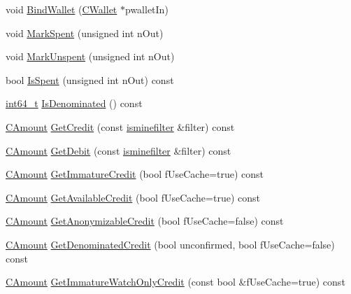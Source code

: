 \begin{DoxyCompactItemize}
void \hyperlink{class_c_wallet_tx_ab0ee7347584bff886dc24b9f63ff023c}{Bind\+Wallet} (\hyperlink{class_c_wallet}{C\+Wallet} $\ast$pwallet\+In)
\item 
void \hyperlink{class_c_wallet_tx_af2fc13459e324ad2b3f7c9914d86e7c8}{Mark\+Spent} (unsigned int n\+Out)
\item 
void \hyperlink{class_c_wallet_tx_a15588d9e12497ec4c10a53ab629fa244}{Mark\+Unspent} (unsigned int n\+Out)
\item 
bool \hyperlink{class_c_wallet_tx_a8873e2d46e0b130dea759af55b83a06c}{Is\+Spent} (unsigned int n\+Out) const 
\item 
\hyperlink{stdint_8h_adec1df1b8b51cb32b77e5b86fff46471}{int64\+\_\+t} \hyperlink{class_c_wallet_tx_a1ba00949ac5e02d8fa2cacaa5b5b1ade}{Is\+Denominated} () const 
\item 
\hyperlink{amount_8h_a4eaf3a5239714d8c45b851527f7cb564}{C\+Amount} \hyperlink{class_c_wallet_tx_a6712fa5cd5831f4a8828b807852d32d0}{Get\+Credit} (const \hyperlink{script_8h_aaa5e1639d76aef50f70532acc3302c4b}{isminefilter} \&filter) const 
\item 
\hyperlink{amount_8h_a4eaf3a5239714d8c45b851527f7cb564}{C\+Amount} \hyperlink{class_c_wallet_tx_a49633327f5b57c3f253c45b5458501d1}{Get\+Debit} (const \hyperlink{script_8h_aaa5e1639d76aef50f70532acc3302c4b}{isminefilter} \&filter) const 
\item 
\hyperlink{amount_8h_a4eaf3a5239714d8c45b851527f7cb564}{C\+Amount} \hyperlink{class_c_wallet_tx_a7c192ae2f84392150c1157e04913bd76}{Get\+Immature\+Credit} (bool f\+Use\+Cache=true) const 
\item 
\hyperlink{amount_8h_a4eaf3a5239714d8c45b851527f7cb564}{C\+Amount} \hyperlink{class_c_wallet_tx_afc5a3b08c3e48e176e389cf172ae79b7}{Get\+Available\+Credit} (bool f\+Use\+Cache=true) const 
\item 
\hyperlink{amount_8h_a4eaf3a5239714d8c45b851527f7cb564}{C\+Amount} \hyperlink{class_c_wallet_tx_a8bb9ffa6758ee861cd65100242c90882}{Get\+Anonymizable\+Credit} (bool f\+Use\+Cache=false) const 
\item 
\hyperlink{amount_8h_a4eaf3a5239714d8c45b851527f7cb564}{C\+Amount} \hyperlink{class_c_wallet_tx_a766d81241f3fb2d6f5a4d6dbbab0ed41}{Get\+Denominated\+Credit} (bool unconfirmed, bool f\+Use\+Cache=false) const 
\item 
\hyperlink{amount_8h_a4eaf3a5239714d8c45b851527f7cb564}{C\+Amount} \hyperlink{class_c_wallet_tx_af6f81048bbda5a788376e9d965da3030}{Get\+Immature\+Watch\+Only\+Credit} (const bool \&f\+Use\+Cache=true) const 
\item 

\end{DoxyCompactItemize}

